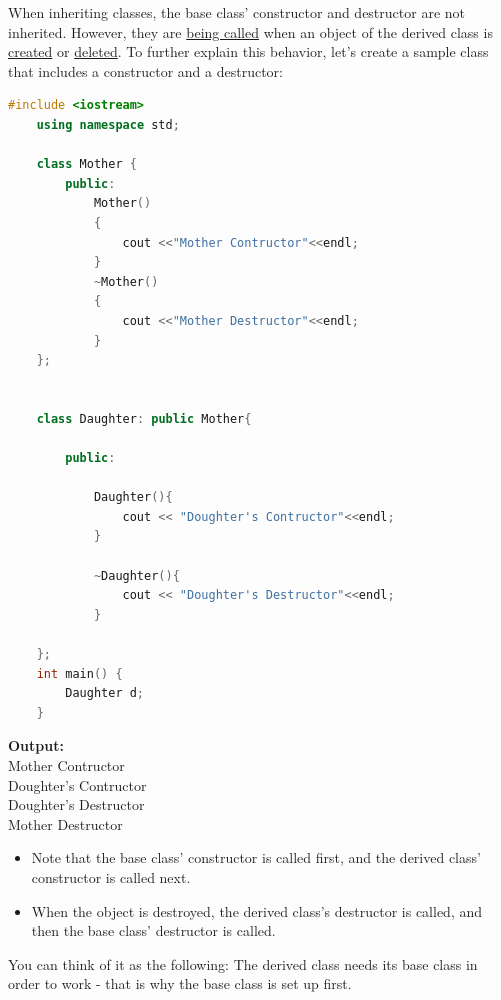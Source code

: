 \documentclass[12pt , a4paper]{article}
\begin{document}
When inheriting classes, the base class' constructor and destructor are not inherited.
However, they are \underline{being called} when an object of the derived class is \underline{created} or \underline{deleted}.
To further explain this behavior, let's create a sample class that includes a constructor and a destructor:
	\begin{lstlisting}[language=C++]
	#include <iostream>
	using namespace std;
	
	class Mother {
	    public:
	        Mother() 
	        {
	            cout <<"Mother Contructor"<<endl;
	        }
	        ~Mother()
	        {
	            cout <<"Mother Destructor"<<endl;
	        }
	};
	
	
	class Daughter: public Mother{
	
	    public:
	
	        Daughter(){
	            cout << "Doughter's Contructor"<<endl;
	        }
	
	        ~Daughter(){
	            cout << "Doughter's Destructor"<<endl;
	        }
	
	};
	int main() {
	    Daughter d;
	}
	\end{lstlisting}

	\begin{tcolorbox}
	\textbf{Output:}\\
	Mother Contructor\\
	Doughter's Contructor\\
	Doughter's Destructor\\
	Mother Destructor
	\end{tcolorbox}


	\begin{importantBox}

		\begin{itemize}
			\item Note that the base class' constructor is called first, and the derived class' constructor is called next.\\
			\item When the object is destroyed, the derived class's destructor is called, and then the base class' destructor is called.\\
		\end{itemize}
		You can think of it as the following: The derived class needs its base class in order to work - that is why the base class is set up first.
	\end{importantBox}
\end{document}
